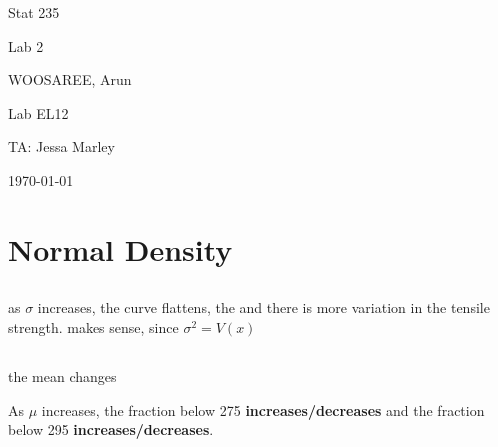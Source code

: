 \documentclass[letterpaper]{article}
\begin{document}
\begin{titlepage}
 \begin{center}
  \vspace*{1cm}
  \Huge
  Stat 235
  \vspace{1cm}
  
  Lab 2
  \vspace{1cm}
  
  WOOSAREE, Arun
  \vspace{1cm}
  
  \Huge
  Lab EL12
  \vspace{1cm}
  
  TA: Jessa Marley
  \vspace{1cm}
  
  \today
  \vfill
 \end{center}
\end{titlepage}

\section{Normal Density}

\subsection{}%


as $\sigma$ increases, the curve flattens, the and there is more variation in
the tensile strength. makes sense, since $\sigma^2=V(x)$

\subsection{}%

the mean changes

As $\mu$ increases, the fraction below 275 \textbf{increases/decreases}
and the fraction below 295 \textbf{increases/decreases}.

\end{document}
